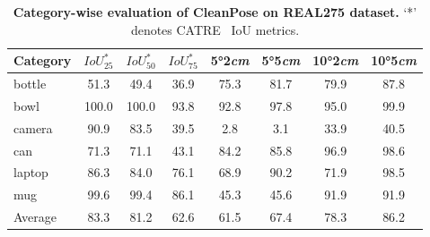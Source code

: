 \begin{table*}[htbp]
    \small
    \centering
    \setlength\tabcolsep{7pt}%
    \begin{tabular}{l|ccc|cccc}%
    \toprule%
     Category & $IoU_{25}^*$ & $IoU_{50}^*$   & $IoU_{75}^*$ & 5°2\emph{cm} & 5°5\emph{cm} & 10°2\emph{cm}  & 10°5\emph{cm} \\ 
     \midrule%
    bottle &51.3 &49.4 &36.9    &75.3 &81.7 &79.9 &87.8 \\
    bowl &100.0 &100.0 &93.8   &92.8 &97.8 &95.0 &99.9  \\
    camera &90.9 &83.5 &39.5   &2.8 &3.1 &33.9 &40.5  \\
    can &71.3 &71.1 &43.1      &84.2 &85.8 &96.9 &98.6  \\
    laptop &86.3 &84.0 &76.1      &68.9 &90.2 &71.9 &98.5  \\
    mug &99.6 &99.4 &86.1      &45.3 &45.6 &91.9 &91.9  \\
    \midrule%
    Average &83.3 &81.2 &62.6 &61.5 &67.4 &78.3 &86.2 \\
    \bottomrule%
    \end{tabular}
    \caption{\textbf{Category-wise evaluation of CleanPose on REAL275 dataset.} ‘*’ denotes CATRE~\cite{liu2022catre} IoU metrics.
    }
    \label{tab:suppl_per_category_real}
\end{table*}


